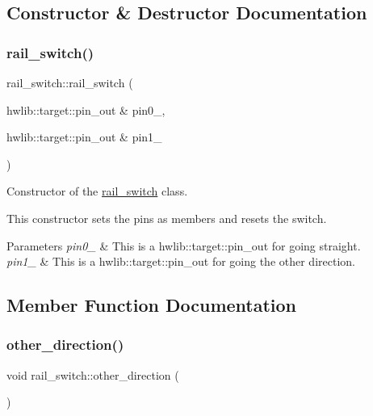 \subsection{Constructor \& Destructor Documentation}
\mbox{\label{classrail__switch_a6104011a15d2d10247fd72a7786f5498}} 
\subsubsection{\texorpdfstring{rail\+\_\+switch()}{rail\_switch()}}
{\footnotesize\ttfamily rail\+\_\+switch\+::rail\+\_\+switch (\begin{DoxyParamCaption}\item[{hwlib\+::target\+::pin\+\_\+out \&}]{pin0\+\_\+,  }\item[{hwlib\+::target\+::pin\+\_\+out \&}]{pin1\+\_\+ }\end{DoxyParamCaption})\hspace{0.3cm}{\ttfamily [inline]}}



Constructor of the \hyperlink{classrail__switch}{rail\+\_\+switch} class. 

This constructor sets the pins as members and \textquotesingle{}resets\textquotesingle{} the switch. 
\begin{DoxyParams}{Parameters}
{\em pin0\+\_\+} & This is a hwlib\+::target\+::pin\+\_\+out for going straight. \\
\hline
{\em pin1\+\_\+} & This is a hwlib\+::target\+::pin\+\_\+out for going the other direction. \\
\hline
\end{DoxyParams}


\subsection{Member Function Documentation}
\mbox{\label{classrail__switch_afbd68a5d9669f2bb67df86c51f9d478b}} 
\subsubsection{\texorpdfstring{other\+\_\+direction()}{other\_direction()}}
{\footnotesize\ttfamily void rail\+\_\+switch\+::other\+\_\+direction (\begin{DoxyParamCaption}{ }\end{DoxyParamCaption})\hspace{0.3cm}{\ttfamily [inline]}}



